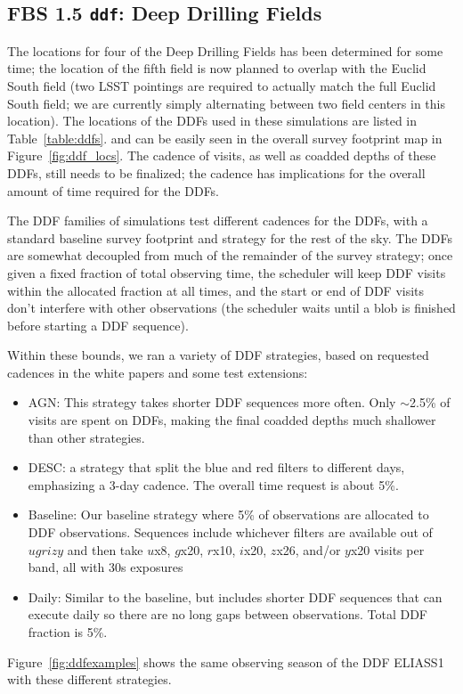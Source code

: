 \subsection{FBS 1.5 {\tt ddf}: Deep Drilling Fields}\label{ss:ddf}

The locations for four of the Deep Drilling Fields has been determined for some time; the location of the fifth field is now planned to overlap with the Euclid South field (two LSST pointings are required to actually match the full Euclid South field; we are currently simply alternating between two field centers in this location). The locations of the DDFs used in these simulations are listed in Table~\ref{table:ddfs}. and can be easily seen in the overall survey footprint map in Figure~\ref{fig:ddf_locs}. The cadence of visits, as well as coadded depths of these DDFs, still needs to be finalized; the cadence has implications for the overall amount of time required for the DDFs. 

The DDF families of simulations test different cadences for the DDFs, with a standard baseline survey footprint and strategy for the rest of the sky. The DDFs are somewhat decoupled from much of the remainder of the survey strategy; once given a fixed fraction of total observing time, the scheduler will keep DDF visits within the allocated fraction at all times, and the start or end of DDF visits don't interfere with other observations (the scheduler waits until a blob is finished before starting a DDF sequence). 

Within these bounds, we ran a variety of DDF strategies, based on requested cadences in the white papers and some test extensions:
\begin{itemize}
    \item{AGN: This strategy takes shorter DDF sequences more often. Only $\sim$2.5\% of visits are spent on DDFs, making the final coadded depths much shallower than other strategies.}
    \item{DESC: a strategy that split the blue and red filters to different days, emphasizing a 3-day cadence. The overall time request is about 5\%.}
     \item{Baseline:  Our baseline strategy where 5\% of observations are allocated to DDF observations. Sequences include whichever filters are available out of $ugrizy$ and then take $u$x8, $g$x20, $r$x10, $i$x20, $z$x26, and/or $y$x20 visits per band, all with 30s exposures}
    \item{Daily: Similar to the baseline, but includes shorter DDF sequences that can execute daily so there are no long gaps between observations. Total DDF fraction is 5\%.}
\end{itemize}
Figure~\ref{fig:ddfexamples} shows the same observing season of the DDF ELIASS1 with these different strategies. 

